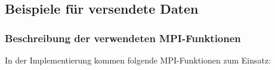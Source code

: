\subsection{Beispiele für versendete Daten}

\begin{figure}[!h]
	
\end{figure}

\subsubsection{Beschreibung der verwendeten MPI-Funktionen}

In der Implementierung kommen folgende MPI-Funktionen zum Einsatz:

